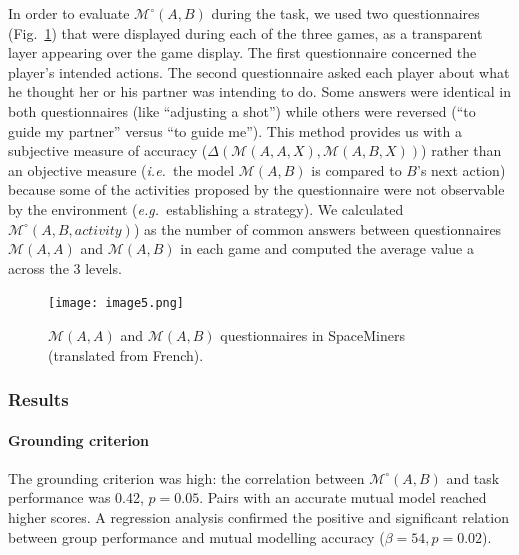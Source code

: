 \documentclass[natbib]{svjour3}
\newcommand{\ie}{{\textit{i.e.\ }}}
\newcommand{\eg}{{\textit{e.g.\ }}}
\newcommand{\M}[3]{{\mathcal{M}(#1, #2, #3)}}
\newcommand{\gmodel}[2]{{$\mathcal{M}(#1, #2)$}}
\newcommand{\Model}[3]{{$\mathcal{M}^{\circ}(#1, #2, #3)$}}
\newcommand{\gModel}[2]{{$\mathcal{M}^{\circ}(#1, #2)$}}
\begin{document}
In order to evaluate \gModel{A}{B} during the task, we used two questionnaires
(Fig.~\ref{study1:questionnaires}) that were displayed during each of the three
games, as a transparent layer appearing over the game display. The first
questionnaire concerned the player's intended actions. The second questionnaire
asked each player about what he thought her or his partner was intending to do.
Some answers were identical in both questionnaires (like ``adjusting a shot'')
while others were reversed (``to guide my partner'' versus ``to guide me'').
This method provides us with a subjective measure of accuracy
($\Delta(\M{A}{A}{X}, \M{A}{B}{X})$) rather than an objective measure (\ie the
model \gmodel{A}{B} is compared to $B$'s next action) because some of the
activities proposed by the questionnaire were not observable by the environment
(\eg establishing a strategy). We calculated \Model{A}{B}{activity})
as the number of common answers between questionnaires \gmodel{A}{A} and
\gmodel{A}{B} in each game and computed the average value a across the 3 levels.

\begin{figure}[ht!]
        \centering
        \texttt{[image: image5.png]}
        \caption{\gmodel{A}{A} and \gmodel{A}{B} questionnaires in SpaceMiners
        (translated from French).}

        \label{study1:questionnaires}
\end{figure}

\subsubsection*{Results}

\paragraph{Grounding criterion} The grounding criterion was high: the
correlation between \gModel{A}{B} and task performance was 0.42, $p = 0.05$.
Pairs with an accurate mutual model reached higher scores. A regression analysis
confirmed the positive and significant relation between group performance and
mutual modelling accuracy ($\beta=54, p = 0.02$).
\end{document}
